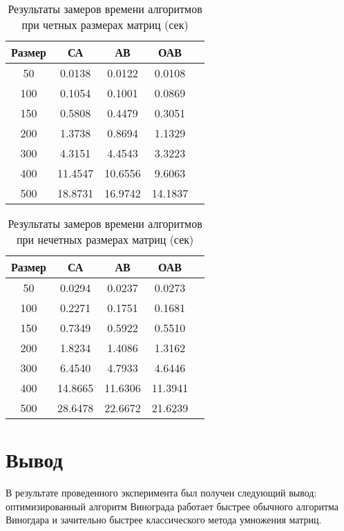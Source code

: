 \begin{table}[h]
	\begin{center}
		\caption{\label{tab:time1}Результаты замеров времени алгоритмов при четных размерах матриц (сек)}
		\begin{tabular}{|c|c|c|c|c|}
		\hline
		Размер & СА &  АВ & ОАВ \\
		\hline
		50  & 0.0138 & 0.0122 & 0.0108\\
		\hline
		100  & 0.1054 & 0.1001 & 0.0869\\
		\hline
		150  & 0.5808 & 0.4479 & 0.3051 \\
		\hline
		200  & 1.3738 & 0.8694 & 1.1329 \\
		\hline
		300  & 4.3151 & 4.4543 & 3.3223 \\
		\hline
		400  & 11.4547 & 10.6556 & 9.6063 \\
		\hline
		500  & 18.8731 & 16.9742 & 14.1837 \\
		\hline
		
		\end{tabular}
	\end{center}
\end{table}


\begin{table}[h]
	\begin{center}
		\caption{\label{tab:time2}Результаты замеров времени алгоритмов при нечетных размерах матриц (сек)}
		\begin{tabular}{|c|c|c|c|c|}
		\hline
		Размер & СА &  АВ & ОАВ \\
		\hline
		50  &0.0294 & 0.0237 & 0.0273\\
		\hline
		100  &0.2271 & 0.1751 & 0.1681\\
		\hline
		150  &0.7349 & 0.5922 & 0.5510 \\
		\hline
		200  &1.8234 &1.4086 & 1.3162 \\
		\hline
		300  & 6.4540 &4.7933 & 4.6446 \\
		\hline
		400  & 14.8665 & 11.6306 & 11.3941 \\
		\hline
		500  & 28.6478 & 22.6672 & 21.6239 \\
		\hline
		\end{tabular}
	\end{center}
\end{table}


\clearpage

\section*{Вывод}

В результате проведенного эксперимента был получен следующий вывод: оптимизированный алгоритм Винограда работает быстрее обычного алгоритма Виногдара и зачительно быстрее классического метода умножения матриц.